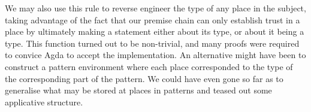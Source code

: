We may also use this rule to reverse engineer
the type of any place in the subject, taking advantage of the fact that
our premise chain can only establish trust in a place by ultimately making
a statement either about its type, or about it being a type. This function
turned out to be non-trivial, and many proofs were required to convice
Agda to accept the implementation. An alternative might have been to
construct a pattern environment where each place corresponded to the
type of the corresponding part of the pattern. We could have even gone
so far as to generalise what may be stored at places in patterns and
teased out some applicative structure.
\begin{code}%
\>[0]\AgdaSpace{}%
\AgdaSymbol{:}%
\>[1407I]\AgdaSymbol{(}\AgdaSpace{}%
\AgdaSymbol{:}\AgdaSpace{}%
\AgdaSymbol{)}%
\>[39]\<%
\\
\>[.][@{}l@{}]\<[1407I]%
\>[9]\AgdaSymbol{(}\AgdaSpace{}%
\AgdaSymbol{:}\AgdaSpace{}%
\AgdaSpace{}%
\AgdaSymbol{(}\AgdaSpace{}%
\AgdaSpace{}%
\AgdaSpace{}%
\AgdaSymbol{)}\AgdaSpace{}%
\AgdaSymbol{)}%
\>[39]\<%
\\
%
\>[9]\AgdaSymbol{(}\AgdaSpace{}%
\AgdaSpace{}%
\AgdaSpace{}%
\AgdaSymbol{)}\AgdaSpace{}%
%
\>[39]\<%
\\
%
\>[9]\AgdaSymbol{((}\AgdaSpace{}%
\AgdaSpace{}%
\AgdaSymbol{(}\AgdaSpace{}%
\AgdaSymbol{))}%
\>[29]\AgdaSymbol{)}%
\>[39]\<%
\\
%
\>[9]\AgdaSpace{}%
\AgdaSymbol{((}\AgdaSpace{}%
\AgdaSymbol{)}\AgdaSpace{}%
\AgdaOperator{\AgdaPrimitive{+}}\AgdaSpace{}%
\AgdaSymbol{)}\<%
\end{code}
